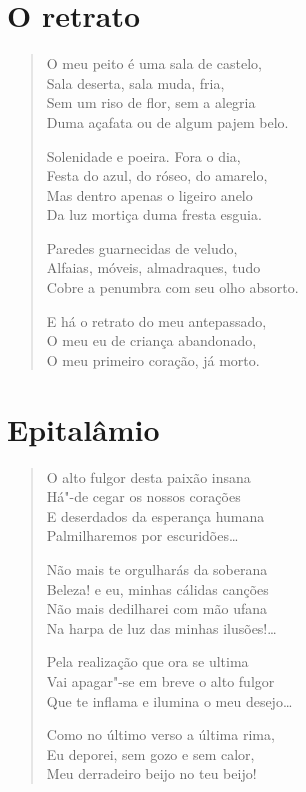 \chapter{O retrato}

\begin{verse}
O meu peito é uma sala de castelo,\\
Sala deserta, sala muda, fria,\\
Sem um riso de flor, sem a alegria\\
Duma açafata ou de algum pajem belo.

Solenidade e poeira. Fora o dia,\\
Festa do azul, do róseo, do amarelo,\\
Mas dentro apenas o ligeiro anelo\\
Da luz mortiça duma fresta esguia.

Paredes guarnecidas de veludo,\\
Alfaias, móveis, almadraques, tudo\\
Cobre a penumbra com seu olho absorto.

E há o retrato do meu antepassado,\\
O meu eu de criança abandonado,\\
O meu primeiro coração, já morto.
\end{verse}

\chapter{Epitalâmio}

\begin{verse}
O alto fulgor desta paixão insana\\
Há"-de cegar os nossos corações\\
E deserdados da esperança humana\\
Palmilharemos por escuridões\ldots{}

Não mais te orgulharás da soberana\\
Beleza! e eu, minhas cálidas canções\\
Não mais dedilharei com mão ufana\\
Na harpa de luz das minhas ilusões!\ldots{}

Pela realização que ora se ultima\\
Vai apagar"-se em breve o alto fulgor\\
Que te inflama e ilumina o meu desejo\ldots{}

Como no último verso a última rima,\\
Eu deporei, sem gozo e sem calor,\\
Meu derradeiro beijo no teu beijo!
\end{verse}

